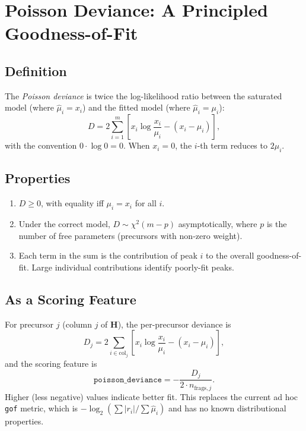 \documentclass[11pt,a4paper]{article}
\begin{document}
\section{Poisson Deviance: A Principled Goodness-of-Fit}
\label{sec:deviance}

\subsection{Definition}

The \emph{Poisson deviance} is twice the log-likelihood ratio between the saturated model
(where $\hat{\mu}_i = x_i$) and the fitted model (where $\hat{\mu}_i = \mu_i$):
\begin{equation}
    D = 2 \sum_{i=1}^{m} \left[
        x_i \log\frac{x_i}{\mu_i} - (x_i - \mu_i)
    \right],
    \label{eq:deviance}
\end{equation}
with the convention $0 \cdot \log 0 = 0$. When $x_i = 0$, the $i$-th term reduces to
$2\mu_i$.

\subsection{Properties}

\begin{enumerate}[]
    \item $D \geq 0$, with equality iff $\mu_i = x_i$ for all $i$.
    \item Under the correct model, $D \sim \chi^2(m - p)$ asymptotically, where $p$ is
          the number of free parameters (precursors with non-zero weight).
    \item Each term in the sum is the contribution of peak $i$ to the overall
          goodness-of-fit. Large individual contributions identify poorly-fit peaks.
\end{enumerate}

\subsection{As a Scoring Feature}

For precursor $j$ (column $j$ of $\mathbf{H}$), the per-precursor deviance is
\begin{equation}
    D_j = 2 \sum_{i \in \text{col}_j}
    \left[ x_i \log\frac{x_i}{\mu_i} - (x_i - \mu_i) \right],
\end{equation}
and the scoring feature is
\begin{equation}
    \texttt{poisson\_deviance} = -\frac{D_j}{2 \cdot n_{\text{frags},j}}.
\end{equation}
Higher (less negative) values indicate better fit. This replaces the current ad hoc
\texttt{gof} metric, which is $-\log_2(\sum|r_i| / \sum\hat{\mu}_i)$ and has no known
distributional properties.
\end{document}
